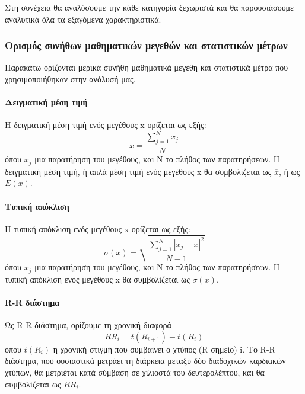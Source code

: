 Στη συνέχεια θα αναλύσουμε την κάθε κατηγορία ξεχωριστά και θα παρουσιάσουμε αναλυτικά όλα τα εξαγόμενα χαρακτηριστικά.

\subsubsection*{Ορισμός συνήθων μαθηματικών μεγεθών και στατιστικών μέτρων}
Παρακάτω ορίζονται μερικά συνήθη μαθηματικά μεγέθη και στατιστικά μέτρα που χρησιμοποιήθηκαν στην ανάλυσή μας.
\paragraph{Δειγματική μέση τιμή}
Η δειγματική μέση τιμή ενός μεγέθους x ορίζεται ως εξής:
\begin{equation}
\label{eq:mean}
   \overline{x}=\frac{\sum_{j=1}^{N} x_j}{N}
\end{equation}
όπου $x_j$ μια παρατήρηση του μεγέθους, και Ν το πλήθος των παρατηρήσεων. Η δειγματική μέση τιμή, ή απλά μέση τιμή ενός μεγέθους x θα συμβολίζεται ως $\overline{x}$, ή ως $E(x)$.

\paragraph{Τυπική απόκλιση}
Η τυπική απόκλιση ενός μεγέθους x ορίζεται ως εξής:
\begin{equation}
\label{eq:standard_deviation}
   \sigma(x)=\sqrt{\frac{\sum_{j=1}^{N} |x_j-\overline{x}|^2 }{N-1}}
\end{equation}
όπου $x_j$ μια παρατήρηση του μεγέθους, και Ν το πλήθος των παρατηρήσεων. Η τυπική απόκλιση ενός μεγέθους x θα συμβολίζεται ως $\sigma(x)$.


\paragraph{R-R διάστημα}
Ως R-R διάστημα, ορίζουμε τη χρονική διαφορά
\begin{equation}
\label{eq:RR}
   RR_i = t(R_{i+1}) - t(R_i)
\end{equation}
όπου $t(R_i)$ η χρονική στιγμή που συμβαίνει ο χτύπος (R σημείο) i. Το R-R διάστημα, που ουσιαστικά μετράει τη διάρκεια μεταξύ δύο διαδοχικών καρδιακών χτύπων, θα μετριέται κατά σύμβαση σε χιλιοστά του δευτερολέπτου, και θα συμβολίζεται ως $RR_i$.


